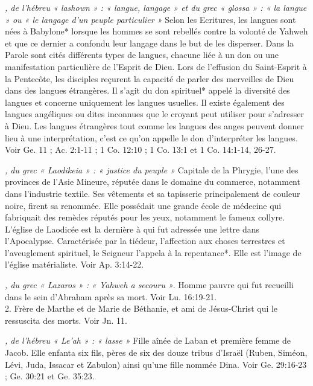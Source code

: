 \begin{multicols}{2}
\textit{, de l'hébreu « lashown » : « langue, langage » et du grec « glossa » : « la langue » ou « le langage d'un peuple particulier »}\newline
Selon les Ecritures, les langues sont nées à Babylone* lorsque les hommes se sont rebellés contre la volonté de Yahweh et que ce dernier a confondu leur langage dans le but de les disperser. Dans la Parole sont cités différents types de langues, chacune liée à un don ou une manifestation particulière de l'Esprit de Dieu. Lors de l'effusion du Saint-Esprit à la Pentecôte, les disciples reçurent la capacité de parler des merveilles de Dieu dans des langues étrangères. Il s'agit du don spirituel* appelé la diversité des langues et concerne uniquement les langues usuelles. Il existe également des langues angéliques ou dites inconnues que le croyant peut utiliser pour s'adresser à Dieu. Les langues étrangères tout comme les langues des anges peuvent donner lieu à une interprétation, c'est ce qu'on appelle le don d'interpréter les langues. Voir Ge. 11 ; Ac. 2:1-11 ; 1 Co. 12:10 ; 1 Co. 13:1 et 1 Co. 14:1-14, 26-27.

\textit{, du grec « Laodikeia » : « justice du peuple »}\newline
Capitale de la Phrygie, l'une des provinces de l'Asie Mineure, réputée dans le domaine du commerce, notamment dans l'industrie textile. Ses vêtements et sa tapisserie principalement de couleur noire, firent sa renommée. Elle possédait une grande école de médecine qui fabriquait des remèdes réputés pour les yeux, notamment le fameux collyre. L'église de Laodicée est la dernière à qui fut adressée une lettre dans l'Apocalypse. Caractérisée par la tiédeur, l'affection aux choses terrestres et l'aveuglement spirituel, le Seigneur l'appela à la repentance*. Elle est l'image de l'église matérialiste. Voir Ap. 3:14-22.

\textit{, du grec « Lazaros » : « Yahweh a secouru »}. Homme pauvre qui fut recueilli dans le sein d'Abraham après sa mort. Voir Lu. 16:19-21.
\\2. Frère de Marthe et de Marie de Béthanie, et ami de Jésus-Christ qui le ressuscita des morts. Voir Jn. 11.

\textit{, de l'hébreu « Le'ah » : « lasse »}\newline
Fille aînée de Laban et première femme de Jacob. Elle enfanta six fils, pères de six des douze tribus d'Israël (Ruben, Siméon, Lévi, Juda, Issacar et Zabulon) ainsi qu'une fille nommée Dina. Voir Ge. 29:16-23 ; Ge. 30:21 et Ge. 35:23.


\end{multicols}
